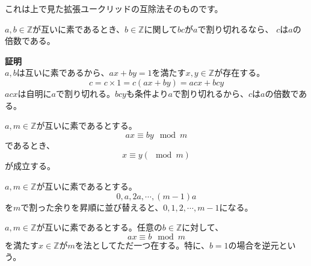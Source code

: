 これは上で見た拡張ユークリッドの互除法そのものです。

\begin{theorembox}
    $a, b \in \mathbb{Z}$が互いに素であるとき、$b \in \mathbb{Z}$に関して$bc$が$a$で割り切れるなら、
    $c$は$a$の倍数である。

    \textbf{証明}  \\
    $a, b$は互いに素であるから、$ax + by = 1$を満たす$x, y \in \mathbb{Z}$が存在する。
    \begin{equation*}
        c = c \times 1 = c (ax + by) = acx + bcy
    \end{equation*}
    $acx$は自明に$a$で割り切れる。$bcy$も条件より$a$で割り切れるから、$c$は$a$の倍数である。

\end{theorembox}

\begin{theorembox}[合同式の割り算]
    $a, m \in \mathbb{Z}$が互いに素であるとする。
    \begin{equation*}
        ax \equiv by \mod{m}
    \end{equation*}
    であるとき、
    \begin{equation*}
        x\equiv y (\mod{m})
    \end{equation*}
    が成立する。
\end{theorembox}

\begin{theorembox}[倍数の周期性]
    $a, m \in \mathbb{Z}$が互いに素であるとする。
    \begin{equation*}
        0, a, 2a, \cdots, (m - 1)a
    \end{equation*}
    を$m$で割った余りを昇順に並び替えると、$0, 1, 2, \cdots, m - 1$になる。
\end{theorembox}

\begin{theorembox}[逆元と合同方程式]
    $a, m \in \mathbb{Z}$が互いに素であるとする。任意の$b \in \mathbb{Z}$に対して、
    \begin{equation*}
        a x \equiv b \mod{m}
    \end{equation*}
    を満たす$x \in \mathbb{Z}$が$m$を法としてただ一つ在する。特に、$b = 1$の場合を逆元という。
\end{theorembox}

